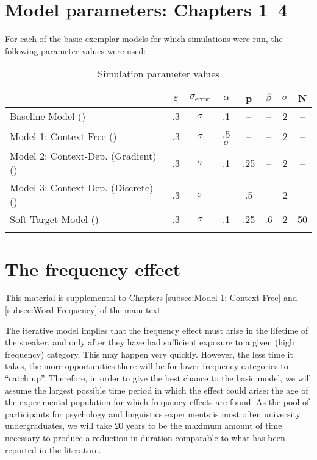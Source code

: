 \chapter{\label{chap:Appendix A}Model parameters: Chapters 1--4}

For each of the basic exemplar models for which simulations were run,
the following parameter values were used:

\begin{table}[H]\footnotesize
\caption{Simulation parameter values}
\begin{tabular}{lS[table-format=1.1]cS[table-format=1.1]S[table-format=1.1]S[table-format=1.1]cc}
\lsptoprule
 & {$\varepsilon$} & {$\sigma_{\text{error}}$} & $\alpha$ & {p} & {$\beta$} & $\sigma$ & {N}\tabularnewline
\midrule
Baseline Model () & .3 & $\sigma$ & .1 & – & – & 2 & –\tabularnewline
Model 1: Context-Free () & .3 & $\sigma$ & .5$\sigma$ & – & – & 2 & –\tabularnewline
Model 2: Context-Dep. (Gradient) () & .3 & $\sigma$ & .1 & .25 & – & 2 & –\tabularnewline
Model 3: Context-Dep. (Discrete) () & .3 & $\sigma$ & – & .5 & – & 2 & –\tabularnewline
Soft-Target Model () & .3 & $\sigma$ & .1 & .25 & .6 & 2 & 50\tabularnewline
\lspbottomrule
\end{tabular}

\end{table}


\chapter{\label{chap:Appendix B}The frequency effect}

This material is supplemental to Chapters \ref{subsec:Model-1:-Context-Free}
and \ref{subsec:Word-Frequency} of the main text.

The iterative model implies that the frequency effect must arise in
the lifetime of the speaker, and only after they have had sufficient
exposure to a given (high frequency) category. This may happen very
quickly. However, the less time it takes, the more opportunities there
will be for lower-frequency categories to “catch up”. Therefore,
in order to give the best chance to the basic model, we will assume
the largest possible time period in which the effect could arise:
the age of the experimental population for which frequency effects
are found. As the pool of participants for psychology and linguistics
experiments is most often university undergraduates, we will take
20 years to be the maximum amount of time necessary to produce a reduction
in duration comparable to what has been reported in the literature.


